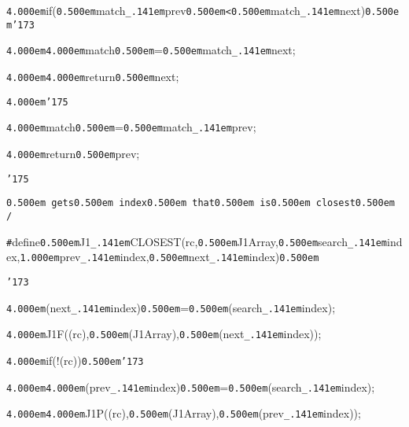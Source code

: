 \noindent
{}{\tt\mc \kern4.000em}if({\tt\mc \kern0.500em}match{\tt\_\kern.141em}prev{\tt\mc \kern0.500em}{\tt <}{\tt\mc \kern0.500em}match{\tt\_\kern.141em}next){\tt\mc \kern0.500em}{\tt\char'173}

\noindent
{}{\tt\mc \kern4.000em}{\tt\mc \kern4.000em}{\tt *}match{\tt\mc \kern0.500em}={\tt\mc \kern0.500em}match{\tt\_\kern.141em}next;

\noindent
{}{\tt\mc \kern4.000em}{\tt\mc \kern4.000em}return{\tt\mc \kern0.500em}next;

\noindent
{}{\tt\mc \kern4.000em}{\tt\char'175}

\noindent
{}\hfill

\noindent
{}{\tt\mc \kern4.000em}{\tt *}match{\tt\mc \kern0.500em}={\tt\mc \kern0.500em}match{\tt\_\kern.141em}prev;

\noindent
{}{\tt\mc \kern4.000em}return{\tt\mc \kern0.500em}prev;

\noindent
{}{\tt\char'175}

\noindent
{}\hfill

\noindent
{}\hfill

\noindent
{}\tt\mc {\tt /}{\tt *}\kern0.500em gets\kern0.500em index\kern0.500em that\kern0.500em is\kern0.500em closest\kern0.500em {\tt *}{\tt /}
\tt\mc 

\noindent
{}\hfill

\noindent
{}{\tt\#}define{\tt\mc \kern0.500em}J1{\tt\_\kern.141em}CLOSEST(rc,{\tt\mc \kern0.500em}J1Array,{\tt\mc \kern0.500em}search{\tt\_\kern.141em}index,{\tt\mc \kern1.000em}prev{\tt\_\kern.141em}index,{\tt\mc \kern0.500em}next{\tt\_\kern.141em}index){\tt\mc \kern0.500em}{\tt{}}

\noindent
{}{\tt\char'173}{\tt{}}

\noindent
{}{\tt\mc \kern4.000em}(next{\tt\_\kern.141em}index){\tt\mc \kern0.500em}={\tt\mc \kern0.500em}(search{\tt\_\kern.141em}index);{\tt{}}

\noindent
{}{\tt\mc \kern4.000em}J1F((rc),{\tt\mc \kern0.500em}(J1Array),{\tt\mc \kern0.500em}(next{\tt\_\kern.141em}index));{\tt{}}

\noindent
{}{\tt\mc \kern4.000em}if(!(rc)){\tt\mc \kern0.500em}{\tt\char'173}{\tt{}}

\noindent
{}{\tt\mc \kern4.000em}{\tt\mc \kern4.000em}(prev{\tt\_\kern.141em}index){\tt\mc \kern0.500em}={\tt\mc \kern0.500em}(search{\tt\_\kern.141em}index);{\tt{}}

\noindent
{}{\tt\mc \kern4.000em}{\tt\mc \kern4.000em}J1P((rc),{\tt\mc \kern0.500em}(J1Array),{\tt\mc \kern0.500em}(prev{\tt\_\kern.141em}index));{\tt{}}

